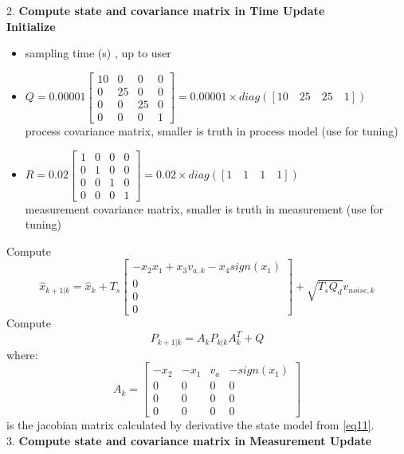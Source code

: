 \documentclass[12pt,a4paper]{article}
\begin{document}
	2. \textbf{Compute state and covariance matrix in Time Update}\\
	\textbf{Initialize}
	\begin{itemize}
		\item { sampling time (s) , up to user}
		\item \(Q = 0.00001
		\begin{bmatrix}
			10 & 0  & 0  & 0 \\
			0  & 25 & 0  & 0 \\
			0  & 0  & 25 & 0 \\
			0  & 0  & 0  & 1 
		\end{bmatrix} 
		= 0.00001 \times diag([10\quad 25\quad 25\quad 1])\) \\process covariance matrix, smaller is truth in process model (use for tuning)
		\item \(R = 0.02
		\begin{bmatrix}
			1 & 0 & 0 & 0 \\
			0 & 1 & 0 & 0 \\
			0 & 0 & 1 & 0 \\
			0 & 0 & 0 & 1 
		\end{bmatrix} 
		= 0.02 \times diag([1\quad 1\quad 1\quad 1])\) \\measurement covariance matrix, smaller is truth in measurement (use for tuning)
	\end{itemize}
	Compute \[\hat{x}_{k+1|k} = \hat{x}_k + T_s
	\begin{bmatrix}
		-x_2 x_1 + x_3 v_{a,k} - x_4sign(x_1) \\
		0                                     \\
		0                                     \\
		0                                     
	\end{bmatrix} + \boxed{\sqrt{T_s Q_d}v_{noise,k}}\]
	Compute
	\[P_{k+1|k} = A_kP_{k|k}A^T_k+Q\]
	where:
	\[A_k =
	\begin{bmatrix}
		-x_2 & -x_1 & v_a & -sign(x_1) \\
		0    & 0    & 0   & 0          \\
		0    & 0    & 0   & 0          \\
		0    & 0    & 0   & 0          
	\end{bmatrix}\]
	is the jacobian matrix calculated by derivative the state model from \autoref{eq11}.
	\\
	3. \textbf{Compute state and covariance matrix in Measurement Update}\\
\end{document}

